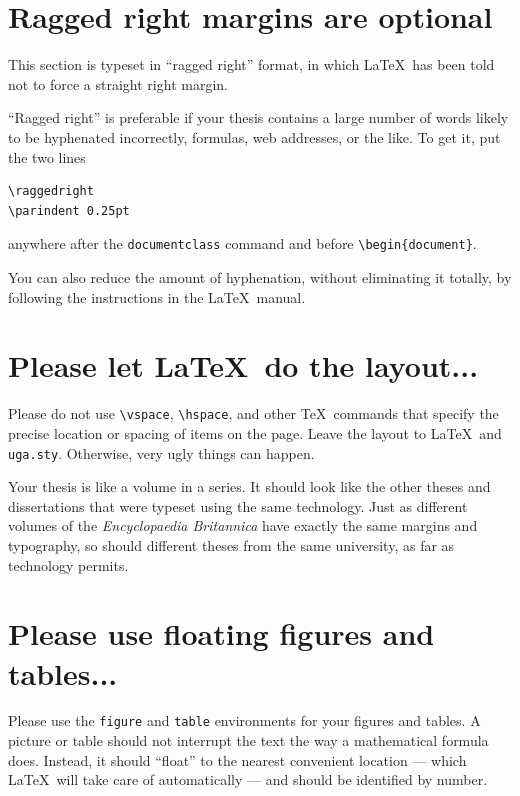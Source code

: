 \documentclass[12pt]{report}
\begin{document}
\section{Ragged right margins are optional}

{
\raggedright
\parindent 0.25in
This section is typeset in ``ragged right'' format, in which \LaTeX\ has been told
not to force a straight right margin.

``Ragged right'' is preferable if your thesis contains a large number of words likely to be hyphenated
incorrectly, formulas, web addresses, or the like.  To get it, put the two lines
\begin{verbatim}
\raggedright
\parindent 0.25pt
\end{verbatim}
anywhere after the {\tt documentclass} command and before \verb"\begin{document}".

You can also reduce the amount of hyphenation, without eliminating it totally, by following
the instructions in the \LaTeX\ manual.



}

\section{Please let \LaTeX\ do the layout...}

Please do not use \verb"\vspace", \verb"\hspace", and other \TeX\ commands that
specify the precise location or spacing of items on the page.
Leave the layout to \LaTeX\ and \verb"uga.sty".
Otherwise, very ugly things can happen.

Your thesis is like a volume in a series.
It should look like the other theses and dissertations that were typeset using
the same technology.
Just as different volumes of the \emph{Encyclopaedia Britannica} have exactly
the same margins and typography, so should different theses from the same
university, as far as technology permits.


\section{Please use floating figures and tables...}

Please use the \verb"figure" and \verb"table" environments for your figures and tables.
A picture or table should not interrupt the text the way a mathematical formula does.
Instead, it should ``float'' to the nearest convenient location --- which \LaTeX\ will
take care of automatically --- and should be identified by number.
\end{document}
